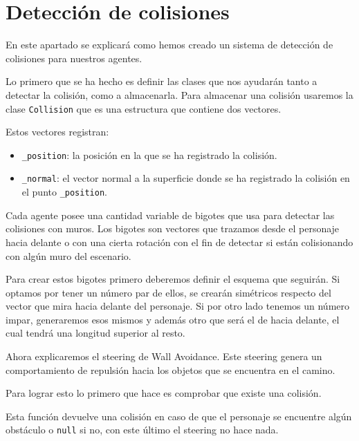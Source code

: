 \section{Detección de colisiones}

En este apartado se explicará como hemos creado un sistema de detección de colisiones para nuestros agentes. 

Lo primero que se ha hecho es definir las clases que nos ayudarán tanto a detectar la colisión, como a almacenarla. Para almacenar una colisión usaremos la clase \texttt{Collision} que es una estructura que contiene dos vectores.



Estos vectores registran:
\begin{itemize}
    \item \texttt{\_position}: la posición en la que se ha registrado la colisión.
    \item \texttt{\_normal}: el vector normal a la superficie donde se ha registrado la colisión en el punto \texttt{\_position}.
\end{itemize}

Cada agente posee una cantidad variable de bigotes que usa para detectar las colisiones con muros. Los bigotes son vectores que trazamos desde el personaje hacia delante o con una cierta rotación con el fin de detectar si están colisionando con algún muro del escenario. 

Para crear estos bigotes primero deberemos definir el esquema que seguirán. Si optamos por tener un número par de ellos, se crearán simétricos respecto del vector que mira hacia delante del personaje. Si por otro lado tenemos un número impar, generaremos esos mismos y además otro que será el de hacia delante, el cual tendrá una longitud superior al resto.

 

Ahora explicaremos el steering de Wall Avoidance. Este steering genera un comportamiento de repulsión hacia los objetos que se encuentra en el camino.

Para lograr esto lo primero que hace es comprobar que existe una colisión.

 
 
 Esta función devuelve una colisión en caso de que el personaje se encuentre algún obstáculo o \texttt{null} si no, con este último el steering no hace nada.
 
